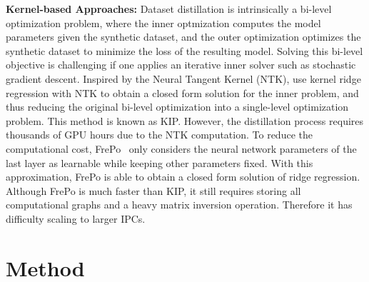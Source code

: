 \documentclass[10pt,twocolumn,letterpaper]{article}
\begin{document}
\noindent\textbf{Kernel-based Approaches:}
Dataset distillation is intrinsically a bi-level optimization problem, where the inner optmization computes the model parameters given the synthetic dataset, and the outer optimization optimizes the synthetic dataset to minimize the loss of the resulting model. Solving this bi-level objective is challenging if one applies an iterative inner solver such as stochastic gradient descent. 
Inspired by the Neural Tangent Kernel (NTK), \cite{nguyen2020dataset, nguyen2021dataset} 
 use kernel ridge regression with NTK to obtain a closed form solution for the inner problem, and thus reducing the original bi-level optimization into a single-level optimization problem. This method is known as KIP. However, the distillation process requires thousands of GPU hours due to the NTK computation.
To reduce the computational cost, FrePo~\cite{zhou2022dataset} only considers the neural network parameters of the last layer as learnable while keeping other parameters fixed. With this approximation, FrePo is able to obtain a closed form solution of ridge regression. Although FrePo is much faster than KIP, it still requires storing all computational graphs and a heavy matrix inversion operation. Therefore it has difficulty scaling to larger IPCs.

\section{Method}
\end{document}
